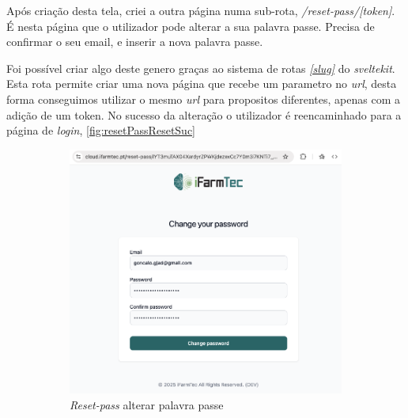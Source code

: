 Após criação desta tela, criei a outra página numa sub-rota, \textit{/reset-pass/[token]}. É nesta página que o utilizador pode alterar a sua palavra passe. Precisa de confirmar o seu email, e inserir a nova palavra passe. 

Foi possível criar algo deste genero graças ao sistema de rotas \href{https://svelte.dev/docs/kit/routing}{\textit{[slug]}} do \textit{sveltekit}. Esta rota permite criar uma nova página que recebe um parametro no \textit{url}, desta forma conseguimos utilizar o mesmo \textit{url} para propositos diferentes, apenas com a adição de um token. No sucesso da alteração o utilizador é reencaminhado para a página de \textit{login}, \autoref{fig:resetPassResetSuc}

\begin{figure}[!h]
	\centering
	\begin{subfigure}[c]{0.35\textwidth}
		\centering
		\includegraphics[width=\textwidth]{figs/reset-pass-3.png}
		\caption{\textit{Reset-pass} alterar palavra passe}
		\label{fig:resetPassReset}
	\end{subfigure}
	\hfill
	\begin{subfigure}[c]{0.35\textwidth}
		\centering

\end{subfigure}
\end{figure}
